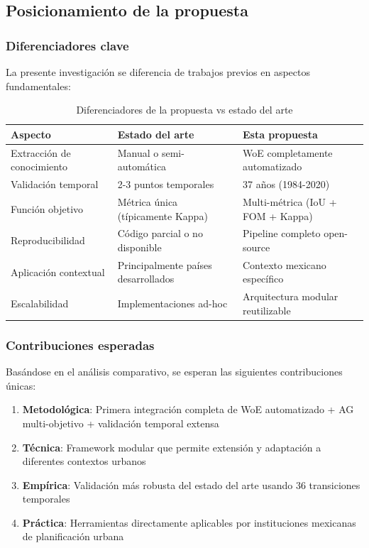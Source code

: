 \subsection{Posicionamiento de la propuesta}

\subsubsection{Diferenciadores clave}

La presente investigación se diferencia de trabajos previos en aspectos fundamentales:

\begin{table}[b]
\centering
\caption{Diferenciadores de la propuesta vs estado del arte}
\renewcommand{\arraystretch}{1.3}
\begin{tabular}{@{}p{4cm}p{5cm}p{5cm}@{}}
\toprule
\textbf{Aspecto} & \textbf{Estado del arte} & \textbf{Esta propuesta} \\
\midrule
Extracción de conocimiento & Manual o semi-automática & WoE completamente automatizado \\
Validación temporal & 2-3 puntos temporales & 37 años (1984-2020) \\
Función objetivo & Métrica única (típicamente Kappa) & Multi-métrica (IoU + FOM + Kappa) \\
Reproducibilidad & Código parcial o no disponible & Pipeline completo open-source \\
Aplicación contextual & Principalmente países desarrollados & Contexto mexicano específico \\
Escalabilidad & Implementaciones ad-hoc & Arquitectura modular reutilizable \\
\bottomrule
\end{tabular}
\label{tab:differentiators}
\end{table}

\subsubsection{Contribuciones esperadas}

Basándose en el análisis comparativo, se esperan las siguientes contribuciones únicas:

\begin{enumerate}
	\item \textbf{Metodológica}: Primera integración completa de WoE automatizado + AG multi-objetivo + validación temporal extensa

	\item \textbf{Técnica}: Framework modular que permite extensión y adaptación a diferentes contextos urbanos

	\item \textbf{Empírica}: Validación más robusta del estado del arte usando 36 transiciones temporales

	\item \textbf{Práctica}: Herramientas directamente aplicables por instituciones mexicanas de planificación urbana
\end{enumerate}

